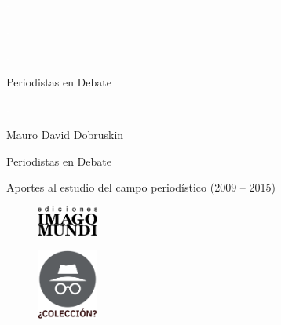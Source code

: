 \newpage
\thispagestyle{empty}
{\textcolor{white}{.}}

\newpage
\thispagestyle{empty}
{\textcolor{white}{.}}

\newpage
\thispagestyle{empty}
{\textcolor{white}{.}}

\vspace{30mm}

\begin{center}
	\LARGE{Periodistas en Debate}
\end{center}

\newpage
\thispagestyle{empty}
{\textcolor{white}{.}}

\newpage
\thispagestyle{empty}
\begin{center}%
{\sc\large{Mauro David Dobruskin}}\\ %
\end{center}

\vspace{30mm}

\begin{center}
\LARGE{Periodistas en Debate}\\\vspace{10mm}

\Large{Aportes al estudio del campo periodístico}
\Large{(2009 -- 2015)}
\end{center}

\vfill

\begin{figure}[b]
\centering
\includegraphics[width=20mm]{./media/logo-imago-ByW.png}
\end{figure}

\newpage
\thispagestyle{empty}
\begin{figure}[t]
\centering
\vspace{-10mm}
\includegraphics[width=20mm]{./media/desconocido.png}\\
\end{figure}

